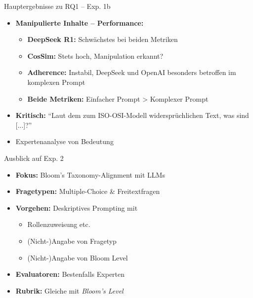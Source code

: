 \documentclass[usenames, dvipsnames, aspectratio=32]{beamer}
\begin{document}
\begin{frame}{Hauptergebnisse zu RQ1 -- Exp. 1b}
    \begin{itemize}
        \item \textbf{Manipulierte Inhalte -- Performance:}
        \begin{itemize}
            \item[$\to$] \textbf{DeepSeek R1:} Schwächstes bei beiden Metriken
            \item[$\to$] \textbf{CosSim:} Stets hoch, Manipulation erkannt?
            \item[$\to$] \textbf{Adherence:} Instabil, DeepSeek und OpenAI besonders betroffen im komplexen Prompt
            \item[$\to$] \textbf{Beide Metriken:} Einfacher Prompt > Komplexer Prompt
        \end{itemize}
        \vspace{.5em}
        \item \textbf{Kritisch:} \enquote{Laut dem zum ISO-OSI-Modell wider\-sprüchlichen Text, was sind [...]?}
        \item[$\to$] Expertenanalyse von Bedeutung
    \end{itemize}
\end{frame}

\begin{frame}{Ausblick auf Exp. 2}
    \begin{itemize}
        \item \textbf{Fokus:} Bloom's Taxonomy-Alignment mit LLMs
        \item \textbf{Fragetypen:} Multiple-Choice \& Freitextfragen
        \item \textbf{Vorgehen:} Deskriptives Prompting mit
            \begin{itemize}
                \item Rollenzuweisung etc.
                \item (Nicht-)Angabe von Fragetyp
                \item (Nicht-)Angabe von Bloom Level
            \end{itemize}
        \item \textbf{Evaluatoren:} Bestenfalls Experten
        \item \textbf{Rubrik:} Gleiche mit \textit{Bloom's Level}
    \end{itemize}
\end{frame}
\end{document}
